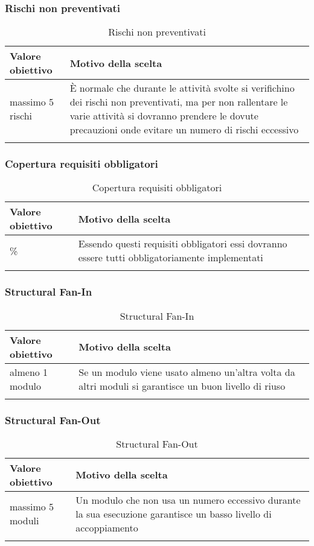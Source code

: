 \documentclass[../PianoDiQualifica_v3.0.0.tex]{subfiles}
\begin{document}
		\subsubsection{Rischi non preventivati}
			\begin{longtable}[c] { >{\centering\arraybackslash}p{4cm} p{7cm} }
				\toprule
				\centerline{\textbf{Valore obiettivo}} & \centerline{\textbf{Motivo della scelta}} \\
				\midrule
					massimo 5 rischi &	È normale che durante le attività svolte si verifichino dei rischi non preventivati, ma per non rallentare le varie attività si dovranno prendere le dovute precauzioni onde evitare un numero di rischi eccessivo  \\
				\bottomrule
				\caption{Rischi non preventivati}
			\end{longtable}

		\subsubsection{Copertura requisiti obbligatori}
			\begin{longtable}[c] { >{\centering\arraybackslash}p{4cm} p{7cm} }
				\toprule
				\centerline{\textbf{Valore obiettivo}} & \centerline{\textbf{Motivo della scelta}} \\
				\midrule
					100\% &	Essendo questi requisiti obbligatori essi dovranno essere tutti obbligatoriamente implementati \\
				\bottomrule
				\caption{Copertura requisiti obbligatori}
			\end{longtable}

		\subsubsection{Structural Fan-In}
			\begin{longtable}[c] { >{\centering\arraybackslash}p{4cm} p{7cm} }
				\toprule
				\centerline{\textbf{Valore obiettivo}} & \centerline{\textbf{Motivo della scelta}} \\
				\midrule
					almeno 1 modulo &	Se un modulo viene usato almeno un'altra volta da altri moduli si garantisce un buon livello di riuso  \\
				\bottomrule
				\caption{Structural Fan-In}
			\end{longtable}

		\subsubsection{Structural Fan-Out}
			\begin{longtable}[c] { >{\centering\arraybackslash}p{4cm} p{7cm} }
				\toprule
				\centerline{\textbf{Valore obiettivo}} & \centerline{\textbf{Motivo della scelta}} \\
				\midrule
					massimo 5 moduli &	Un modulo che non usa un numero eccessivo durante la sua esecuzione garantisce un basso livello di accoppiamento \\
				\bottomrule
				\caption{Structural Fan-Out}
			\end{longtable}
\end{document}
